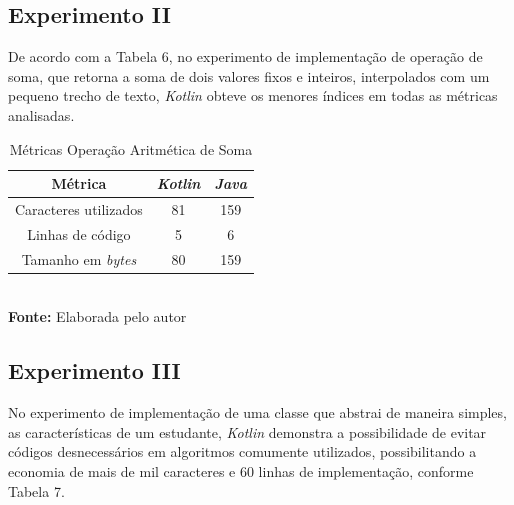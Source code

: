 \subsection{Experimento II}

De acordo com a Tabela 6, no experimento de implementação de operação de soma, que retorna a soma de dois valores fixos e inteiros, interpolados com um pequeno trecho de texto, \textit{Kotlin} obteve os menores índices em todas as métricas analisadas.


\FloatBarrier
\begin{table}[!htbp]
\centering
\caption{Métricas Operação Aritmética de Soma}
	\begin{tabular}{ c | c | c }
		\hline
          \textbf{Métrica} &          \textbf{\textit{Kotlin}}    & \textbf{\textit{Java}}  \\ \hline
		
		  Caracteres utilizados   &     81 	           &            159      \\ \hline
		             
		  Linhas de código        &     5             &            6      \\ \hline
		             
		  Tamanho em \textit{bytes}        &     80             &           159      \\ \hline
		  
	\end{tabular}
	\\ \vspace{0.2cm}
	\textbf{Fonte:} Elaborada pelo autor
	\label{tab:exemplo}
\end{table}
\FloatBarrier

\subsection{Experimento III}

No experimento de implementação de uma classe que abstrai de maneira simples, as características de um estudante, \textit{Kotlin} demonstra a possibilidade de evitar códigos desnecessários em algoritmos comumente utilizados, possibilitando a economia de mais de mil caracteres e 60 linhas de implementação, conforme Tabela 7. 

